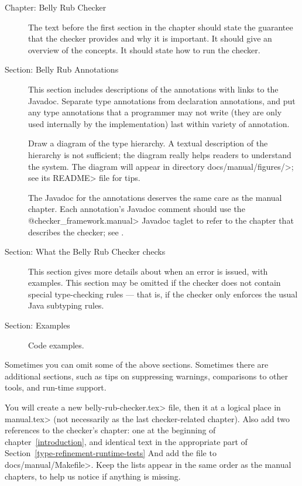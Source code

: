 \begin{description}
\item[Chapter: Belly Rub Checker]
  The text before the first section in the chapter should state the
  guarantee that the checker provides and why it is important.  It should
  give an overview of the concepts.  It should state how to run the checker.
\item[Section: Belly Rub Annotations]
  This section includes descriptions of the annotations with links to the
  Javadoc.  Separate type annotations from declaration annotations, and put
  any type annotations that a programmer may not write (they are only used
  internally by the implementation) last within variety of annotation.

  Draw a diagram of the type hierarchy.  A textual description of
  the hierarchy is not sufficient; the diagram really helps readers to
  understand the system.
  The diagram will appear in directory \<docs/manual/figures/>;
  see its \<README> file for tips.

  The Javadoc for the annotations deserves the same care as the manual
  chapter.  Each annotation's Javadoc comment should use the
  \<@checker\_framework.manual> Javadoc taglet to refer to the chapter that
  describes the checker; see .
\item[Section: What the Belly Rub Checker checks]
  This section gives more details about when an error is issued, with examples.
  This section may be omitted if the checker does not contain special
  type-checking rules --- that is, if the checker only enforces the usual
  Java subtyping rules.
\item[Section: Examples]
  Code examples.
\end{description}

Sometimes you can omit some of the above sections.  Sometimes there are
additional sections, such as tips on suppressing warnings, comparisons to
other tools, and run-time support.

You will create a new \<belly-rub-checker.tex> file,
then \verb|| it at a logical place in \<manual.tex> (not
necessarily as the last checker-related chapter).  Also add two references
to the checker's chapter:  one at the beginning of
chapter~\ref{introduction}, and identical text in the appropriate part of
Section~\ref{type-refinement-runtime-tests}  And add the file to \<docs/manual/Makefile>.
Keep the lists appear in
the same order as the manual chapters, to help us notice if anything is
missing.

